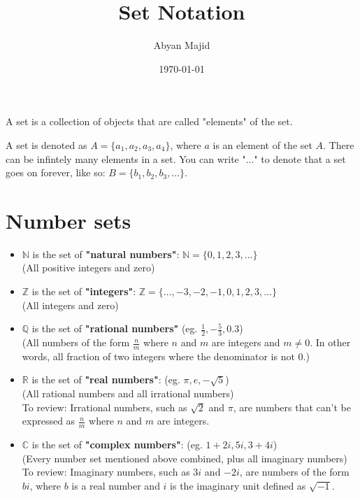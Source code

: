 \documentclass{article}
\begin{document}
\title{Set Notation}
\author{Abyan Majid}
\date{\today}
\maketitle

\begin{center}
    A set is a collection of objects that are called "elements" of the set.
\end{center}

\par
\noindent A set is denoted as $ A = \{ a_1, a_2, a_3, a_4 \} $, where $a$ is an element of the set $A$. There can be infintely many elements in a set. You can write "..." to denote that a set goes on forever, like so: $ B = \{ b_1, b_2, b_3, ... \} $.

\section{Number sets}
\begin{itemize}
    \item $ \mathbb{N} $ is the set of \textbf{"natural numbers"}: $ \mathbb{N} = \{0, 1, 2, 3, ...\} $ \\ (All positive integers and zero)
    \item $ \mathbb{Z} $ is the set of \textbf{"integers"}: $ \mathbb{Z} = \{..., -3, -2, -1, 0, 1, 2, 3, ...\} $ \\ (All integers and zero)
    \item $ \mathbb{Q} $ is the set of \textbf{"rational numbers"} (eg. $\frac{1}{2}, -\frac{5}{3}, 0.3$) \\ (All numbers of the form $\frac{n}{m}$ where $n$ and $m$ are integers and $m \neq 0$. In other words, all fraction of two integers where the denominator is not $0$.)
    \item $ \mathbb{R} $ is the set of \textbf{"real numbers"}: (eg. $\pi, e, -\sqrt{5}$) \\ (All rational numbers and all irrational numbers) \\ To review: Irrational numbers, such as $\sqrt{2}$ and $\pi$, are numbers that can't be expressed as $\frac{n}{m}$ where $n$ and $m$ are integers.
    \item $ \mathbb{C} $ is the set of \textbf{"complex numbers"}: (eg. $1+2i, 5i, 3+4i$) \\ (Every number set mentioned above combined, plus all imaginary numbers) \\ To review: Imaginary numbers, such as $3i$ and $-2i$, are numbers of the form $bi$, where $b$ is a real number and $i$ is the imaginary unit defined as $\sqrt{-1}$.
\end{itemize}
\end{document}
